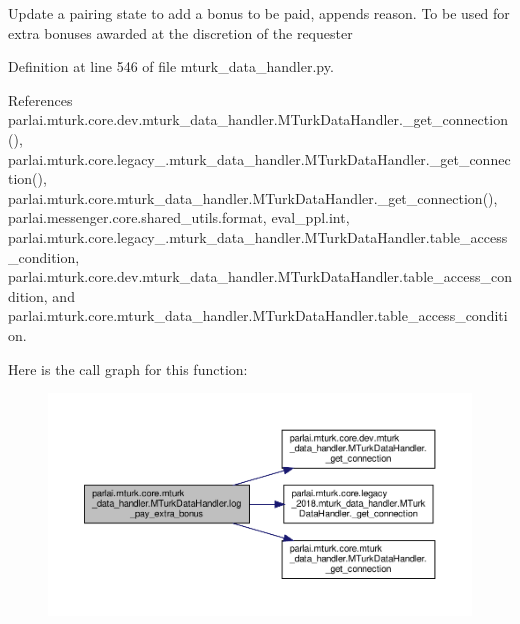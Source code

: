 \begin{DoxyVerb}Update a pairing state to add a bonus to be paid, appends reason.
To be used for extra bonuses awarded at the discretion of the requester
\end{DoxyVerb}
 

Definition at line 546 of file mturk\+\_\+data\+\_\+handler.\+py.



References parlai.\+mturk.\+core.\+dev.\+mturk\+\_\+data\+\_\+handler.\+M\+Turk\+Data\+Handler.\+\_\+get\+\_\+connection(), parlai.\+mturk.\+core.\+legacy\+\_.\+mturk\+\_\+data\+\_\+handler.\+M\+Turk\+Data\+Handler.\+\_\+get\+\_\+connection(), parlai.\+mturk.\+core.\+mturk\+\_\+data\+\_\+handler.\+M\+Turk\+Data\+Handler.\+\_\+get\+\_\+connection(), parlai.\+messenger.\+core.\+shared\+\_\+utils.\+format, eval\+\_\+ppl.\+int, parlai.\+mturk.\+core.\+legacy\+\_.\+mturk\+\_\+data\+\_\+handler.\+M\+Turk\+Data\+Handler.\+table\+\_\+access\+\_\+condition, parlai.\+mturk.\+core.\+dev.\+mturk\+\_\+data\+\_\+handler.\+M\+Turk\+Data\+Handler.\+table\+\_\+access\+\_\+condition, and parlai.\+mturk.\+core.\+mturk\+\_\+data\+\_\+handler.\+M\+Turk\+Data\+Handler.\+table\+\_\+access\+\_\+condition.

Here is the call graph for this function\+:
\nopagebreak
\begin{figure}[H]
\begin{center}
\leavevmode
\includegraphics[width=350pt]{classparlai_1_1mturk_1_1core_1_1mturk__data__handler_1_1MTurkDataHandler_a8924cb67f6d2e884091eadc0235dd209_cgraph}
\end{center}
\end{figure}
\mbox{\label{classparlai_1_1mturk_1_1core_1_1mturk__data__handler_1_1MTurkDataHandler_a9bf202898899acbf690a2633a32b89da}} 
